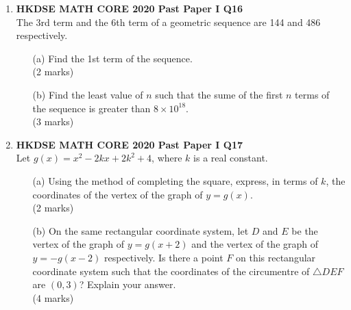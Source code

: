 \documentclass[12pt]{article}
\begin{document}
\begin{enumerate}
	\item \textbf{HKDSE MATH CORE 2020 Past Paper I Q16}\\
	The 3rd term and the 6th term of a geometric sequence are 144 and 486 respectively.
	\begin{enumerate}
		\item[(a)] Find the 1st term of the sequence. \\(2 marks) 
		\item[(b)] Find the least value of $n$ such that the sume of the first $n$ terms of the sequence is greater than $8 \times 10^{18}$. \\(3 marks)
	\end{enumerate}

	\item \textbf{HKDSE MATH CORE 2020 Past Paper I Q17}\\
	Let $g(x) = x^2 - 2kx + 2k^2 + 4$, where $k$ is a real constant.
	\begin{enumerate}
		\item[(a)] Using the method of completing the square, express, in terms of $k$, the coordinates of the vertex of the graph of $y = g(x)$. \\(2 marks)
		\item[(b)] On the same rectangular coordinate system, let $D$ and $E$ be the vertex of the graph of $y = g(x + 2)$ and the vertex of the graph of $y = -g(x -2)$ respectively. Is there a point $F$ on this rectangular coordinate system such that the coordinates of the circumentre of $\triangle DEF$ are $(0,3)$? Explain your answer. \\(4 marks)
	\end{enumerate}


\end{enumerate}
\end{document}
